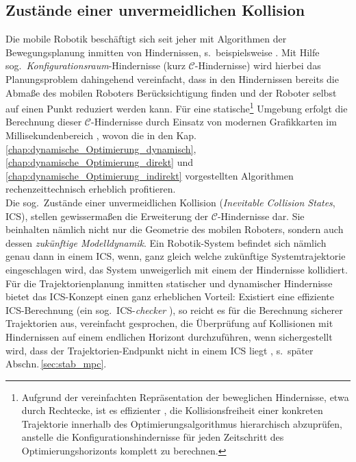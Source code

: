 \subsection{Zustände einer unvermeidlichen Kollision} \label{sec:ics}
Die mobile Robotik beschäftigt sich seit jeher mit Algorithmen der Bewegungsplanung inmitten von Hindernissen, s.\ beispielsweise \cite{latombe1990robot, lavalle2006pa, fox1997dynamic, Fiorini1998}. Mit Hilfe sog.\ \emph{Konfigurationsraum}-Hindernisse (kurz $\mathcal{C}$-Hindernisse) wird hierbei das Planungsproblem dahingehend vereinfacht, dass in den Hindernissen bereits die Abmaße des mobilen Roboters Berücksichtigung finden und der Roboter selbst auf einen Punkt reduziert werden kann. Für eine statische\footnote{Aufgrund der vereinfachten Repräsentation der beweglichen Hindernisse, etwa durch Rechtecke, ist es effizienter \cite{zieglerfastcollision2010, Lin1998}, die Kollisionsfreiheit einer konkreten Trajektorie innerhalb des Optimierungsalgorithmus hierarchisch abzuprüfen, anstelle die Konfigurationshindernisse für jeden Zeitschritt des Optimierungshorizonts komplett zu berechnen.} Umgebung erfolgt die Berechnung dieser $\mathcal{C}$-Hindernisse durch Einsatz von modernen Grafikkarten im Millisekundenbereich \cite{Tanzmeister2014ConfSpaceCosts}, wovon die in den Kap.\,\ref{chap:dynamische_Optimierung_dynamisch}, \ref{chap:dynamische_Optimierung_direkt} und \ref{chap:dynamische_Optimierung_indirekt} vorgestellten Algorithmen rechenzeittechnisch erheblich profitieren. \\
Die sog.\ Zustände einer unvermeidlichen Kollision \cite{fraichard2007short} (\emph{Inevitable Collision States}, ICS), stellen gewissermaßen die Erweiterung der $\mathcal{C}$-Hindernisse dar. Sie beinhalten nämlich nicht nur die Geometrie des mobilen Roboters, sondern auch dessen \emph{zukünftige Modelldynamik}. Ein Robotik-System befindet sich nämlich genau dann in einem ICS, wenn, ganz gleich welche zukünftige Systemtrajektorie eingeschlagen wird, das System unweigerlich mit einem der Hindernisse kollidiert. \\
Für die Trajektorienplanung inmitten statischer und dynamischer Hindernisse bietet das ICS-Konzept einen ganz erheblichen Vorteil: Existiert eine effiziente ICS-Berechnung (ein sog.\ ICS-\emph{checker} \cite{martinez2009collision}), so reicht es für die Berechnung sicherer Trajektorien aus, vereinfacht gesprochen, die Überprüfung auf Kollisionen mit Hindernissen auf einem endlichen Horizont durchzuführen, wenn sichergestellt wird, dass der Trajektorien-Endpunkt nicht in einem ICS liegt \cite{fraichard2007short}, s.\ später Abschn.\,\ref{sec:stab_mpc}.
